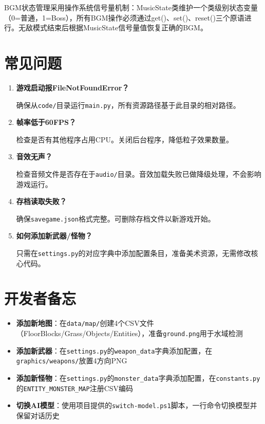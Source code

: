 \documentclass[12pt,a4paper]{ctexart}
\begin{document}
BGM状态管理采用操作系统信号量机制：MusicState类维护一个类级别状态变量（0=普通，1=Boss），所有BGM操作必须通过get()、set()、reset()三个原语进行。无敌模式结束后根据MusicState信号量值恢复正确的BGM。

\section{常见问题}

\begin{enumerate}[label=\textbf{Q\arabic*：}]
    \item \textbf{游戏启动报FileNotFoundError？}

    确保从\texttt{code/}目录运行\texttt{main.py}，所有资源路径基于此目录的相对路径。

    \item \textbf{帧率低于60FPS？}

    检查是否有其他程序占用CPU。关闭后台程序，降低粒子效果数量。

    \item \textbf{音效无声？}

    检查音频文件是否存在于\texttt{audio/}目录。音效加载失败已做降级处理，不会影响游戏运行。

    \item \textbf{存档读取失败？}

    确保\texttt{savegame.json}格式完整。可删除存档文件以新游戏开始。

    \item \textbf{如何添加新武器/怪物？}

    只需在\texttt{settings.py}的对应字典中添加配置条目，准备美术资源，无需修改核心代码。
\end{enumerate}

\section{开发者备忘}

\begin{itemize}
    \item \textbf{添加新地图}：在\texttt{data/map/}创建4个CSV文件（FloorBlocks/Grass/Objects/Entities），准备\texttt{ground.png}用于水域检测
    \item \textbf{添加新武器}：在\texttt{settings.py}的\texttt{weapon\_data}字典添加配置，在\texttt{graphics/weapons/}放置4方向PNG
    \item \textbf{添加新怪物}：在\texttt{settings.py}的\texttt{monster\_data}字典添加配置，在\texttt{constants.py}的\texttt{ENTITY\_MONSTER\_MAP}注册CSV编码
    \item \textbf{切换AI模型}：使用项目提供的\texttt{switch-model.ps1}脚本，一行命令切换模型并保留对话历史
\end{itemize}
\end{document}
